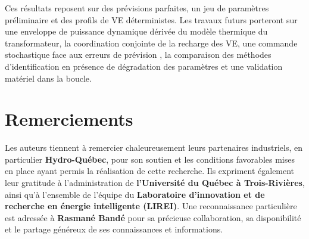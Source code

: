 \documentclass[conference]{IEEEtran}
\begin{document}
Ces résultats reposent sur des prévisions parfaites, un jeu de paramètres préliminaire et des profils de VE déterministes. Les travaux futurs porteront sur une enveloppe de puissance dynamique dérivée du modèle thermique du transformateur, la coordination conjointe de la recharge des VE, une commande stochastique face aux erreurs de prévision \cite{Oldewurtel2012}, la comparaison des méthodes d'identification en présence de dégradation des paramètres et une validation matériel dans la boucle.

\section*{Remerciements}
Les auteurs tiennent à remercier chaleureusement leurs partenaires industriels, en particulier \textbf{Hydro-Québec}, pour son soutien et les conditions favorables mises en place ayant permis la réalisation de cette recherche. Ils expriment également leur gratitude à l’administration de \textbf{l’Université du Québec à Trois-Rivières}, ainsi qu’à l’ensemble de l’équipe du \textbf{Laboratoire d’innovation et de recherche en énergie intelligente (LIREI)}. Une reconnaissance particulière est adressée à \textbf{Rasmané Bandé} pour sa précieuse collaboration, sa disponibilité et le partage généreux de ses connaissances et informations.



\end{document}
